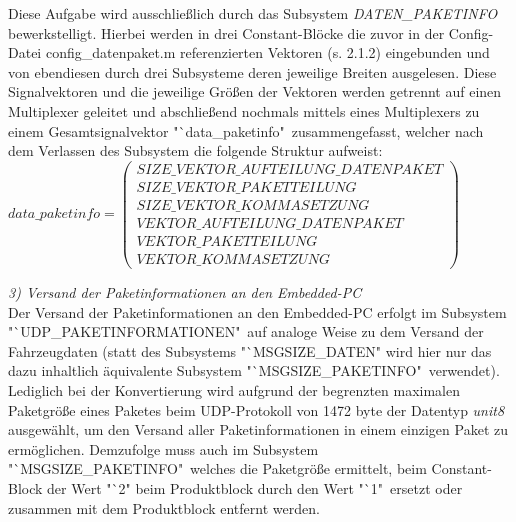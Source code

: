 \documentclass[fontsize = 12pt, paper = a4]{scrreprt}
\begin{document}
\newpage

Diese Aufgabe wird ausschließlich durch das Subsystem \textit{DATEN\_PAKETINFO} bewerkstelligt. Hierbei werden in drei Constant-Blöcke die zuvor in der Config-Datei config\_datenpaket.m referenzierten Vektoren (s. 2.1.2) eingebunden und von ebendiesen durch drei Subsysteme deren jeweilige Breiten ausgelesen. Diese Signalvektoren und die jeweilige Größen der Vektoren werden getrennt auf einen Multiplexer geleitet und abschließend nochmals mittels eines Multiplexers zu einem Gesamtsignalvektor "`data\_paketinfo"\ zusammengefasst, welcher nach dem Verlassen des Subsystem die folgende Struktur aufweist: \\

$ data\_paketinfo = \left( \begin{array}{c} SIZE\_VEKTOR\_AUFTEILUNG\_DATENPAKET \\ SIZE\_VEKTOR\_PAKETTEILUNG \\ SIZE\_VEKTOR\_KOMMASETZUNG \\ VEKTOR\_AUFTEILUNG\_DATENPAKET \\ VEKTOR\_PAKETTEILUNG \\ VEKTOR\_KOMMASETZUNG  \end{array} \right)$ 

\vspace*{5mm}


\textit{3) Versand der Paketinformationen an den Embedded-PC} \\

Der Versand der Paketinformationen an den Embedded-PC erfolgt im Subsystem \\ "`UDP\_PAKETINFORMATIONEN"\ auf analoge Weise zu dem Versand der Fahrzeugdaten (statt des Subsystems "`MSGSIZE\_DATEN" wird hier nur das dazu inhaltlich äquivalente Subsystem "`MSGSIZE\_PAKETINFO"\ verwendet). Lediglich bei der Konvertierung wird aufgrund der begrenzten maximalen Paketgröße eines Paketes beim UDP-Protokoll von  1472 byte der Datentyp \textit{unit8} ausgewählt, um den Versand aller Paketinformationen in einem einzigen Paket zu ermöglichen. Demzufolge muss auch im Subsystem \\ "`MSGSIZE\_PAKETINFO"\, welches die Paketgröße ermittelt, beim Constant-Block der Wert  "`2" beim Produktblock durch den Wert  "`1"\ ersetzt oder zusammen mit dem Produktblock entfernt werden. \\
\end{document}
